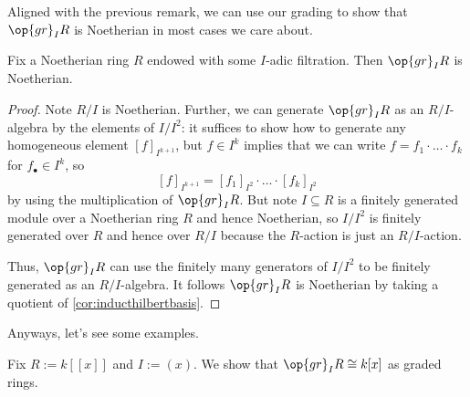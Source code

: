 Aligned with the previous remark, we can use our grading to show that $\op{gr}_IR$ is Noetherian in most cases we care about.
\begin{lemma} \label{lem:assgradedringnoetherian}
	Fix a Noetherian ring $R$ endowed with some $I$-adic filtration. Then $\op{gr}_IR$ is Noetherian.
\end{lemma}
\begin{proof}
	Note $R/I$ is Noetherian. Further, we can generate $\op{gr}_IR$ as an $R/I$-algebra by the elements of $I/I^2$: it suffices to show how to generate any homogeneous element $[f]_{I^{k+1}}$, but $f\in I^k$ implies that we can write $f=f_1\cdot\ldots\cdot f_k$ for $f_\bullet\in I^k$, so
	\[[f]_{I^{k+1}}=[f_1]_{I^2}\cdot\ldots\cdot[f_k]_{I^2}\]
	by using the multiplication of $\op{gr}_IR$. But note $I\subseteq R$ is a finitely generated module over a Noetherian ring $R$ and hence Noetherian, so $I/I^2$ is finitely generated over $R$ and hence over $R/I$ because the $R$-action is just an $R/I$-action.
	
	Thus, $\op{gr}_IR$ can use the finitely many generators of $I/I^2$ to be finitely generated as an $R/I$-algebra. It follows $\op{gr}_IR$ is Noetherian by taking a quotient of \autoref{cor:inducthilbertbasis}.
\end{proof}
Anyways, let's see some examples.
\begin{exe} \label{exe:assgradedringex}
	Fix $R:=k[[x]]$ and $I:=(x)$. We show that $\op{gr}_IR\cong k[x]$ as graded rings.
\end{exe}
